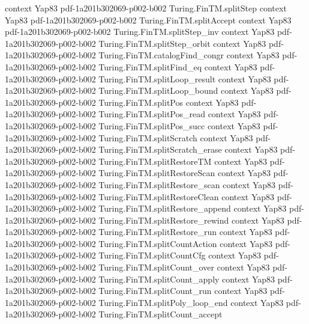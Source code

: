 \begin{theorem}
  {context}
  {Yap83}
  {pdf-1a201b302069-p002-b002}
\proofstep
  {Turing.FinTM.splitStep}
  {context}
  {Yap83}
  {pdf-1a201b302069-p002-b002}
\proofstep
  {Turing.FinTM.splitAccept}
  {context}
  {Yap83}
  {pdf-1a201b302069-p002-b002}
\proofstep
  {Turing.FinTM.splitStep_inv}
  {context}
  {Yap83}
  {pdf-1a201b302069-p002-b002}
\proofstep
  {Turing.FinTM.splitStep_orbit}
  {context}
  {Yap83}
  {pdf-1a201b302069-p002-b002}
\proofstep
  {Turing.FinTM.catalogFind_congr}
  {context}
  {Yap83}
  {pdf-1a201b302069-p002-b002}
\proofstep
  {Turing.FinTM.splitFind_eq}
  {context}
  {Yap83}
  {pdf-1a201b302069-p002-b002}
\proofstep
  {Turing.FinTM.splitLoop_result}
  {context}
  {Yap83}
  {pdf-1a201b302069-p002-b002}
\proofstep
  {Turing.FinTM.splitLoop_bound}
  {context}
  {Yap83}
  {pdf-1a201b302069-p002-b002}
\proofstep
  {Turing.FinTM.splitPos}
  {context}
  {Yap83}
  {pdf-1a201b302069-p002-b002}
\proofstep
  {Turing.FinTM.splitPos_read}
  {context}
  {Yap83}
  {pdf-1a201b302069-p002-b002}
\proofstep
  {Turing.FinTM.splitPos_succ}
  {context}
  {Yap83}
  {pdf-1a201b302069-p002-b002}
\proofstep
  {Turing.FinTM.splitScratch}
  {context}
  {Yap83}
  {pdf-1a201b302069-p002-b002}
\proofstep
  {Turing.FinTM.splitScratch_erase}
  {context}
  {Yap83}
  {pdf-1a201b302069-p002-b002}
\proofstep
  {Turing.FinTM.splitRestoreTM}
  {context}
  {Yap83}
  {pdf-1a201b302069-p002-b002}
\proofstep
  {Turing.FinTM.splitRestoreScan}
  {context}
  {Yap83}
  {pdf-1a201b302069-p002-b002}
\proofstep
  {Turing.FinTM.splitRestore_scan}
  {context}
  {Yap83}
  {pdf-1a201b302069-p002-b002}
\proofstep
  {Turing.FinTM.splitRestoreClean}
  {context}
  {Yap83}
  {pdf-1a201b302069-p002-b002}
\proofstep
  {Turing.FinTM.splitRestore_append}
  {context}
  {Yap83}
  {pdf-1a201b302069-p002-b002}
\proofstep
  {Turing.FinTM.splitRestore_rewind}
  {context}
  {Yap83}
  {pdf-1a201b302069-p002-b002}
\proofstep
  {Turing.FinTM.splitRestore_run}
  {context}
  {Yap83}
  {pdf-1a201b302069-p002-b002}
\proofstep
  {Turing.FinTM.splitCountAction}
  {context}
  {Yap83}
  {pdf-1a201b302069-p002-b002}
\proofstep
  {Turing.FinTM.splitCountCfg}
  {context}
  {Yap83}
  {pdf-1a201b302069-p002-b002}
\proofstep
  {Turing.FinTM.splitCount_over}
  {context}
  {Yap83}
  {pdf-1a201b302069-p002-b002}
\proofstep
  {Turing.FinTM.splitCount_apply}
  {context}
  {Yap83}
  {pdf-1a201b302069-p002-b002}
\proofstep
  {Turing.FinTM.splitCount_run}
  {context}
  {Yap83}
  {pdf-1a201b302069-p002-b002}
\proofstep
  {Turing.FinTM.splitPoly_loop_end}
  {context}
  {Yap83}
  {pdf-1a201b302069-p002-b002}
\proofstep
  {Turing.FinTM.splitCount_accept}

\end{theorem}
